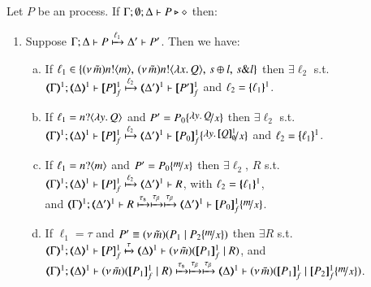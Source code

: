 
\begin{proposition}\rm
	\label{app:prop:op_corr_HOp_to_HO}
	Let $P$ be an \HOp process.
	If $\Gamma; \emptyset; \Delta \vdash P \triangleright \diamond$ then:
%
	\begin{enumerate}[1.]
		\item
			Suppose $\Gamma; \Delta \vdash P \xmapsto{\ell_1} \Delta' \vdash P'$. Then we have:
%
			\begin{enumerate}[a)]
				\item
					If $\ell_1 \in \{(\nu\, \tilde{m})n ! \langle m \rangle, \,(\nu\, \tilde{m})n ! \langle \lambda x.\,Q \rangle, \,s \oplus l, \,s \& l\}$
					then $\exists \ell_2$ s.t. \\
					$\horel{\tmap{\Gamma}{1}}{\tmap{\Delta}{1}}{\pmapp{P}{1}{f}}{\hby{\ell_2}}{\tmap{\Delta'}{1}}{\pmapp{P'}{1}{f}}$
					and $\ell_2 = \{\!\!\{\ell_1\}\!\!\}^{1}$.
			
				\item
					If $\ell_1 = n ? \langle \lambda y.\,Q \rangle$ and
					$P' = P_0 \subst{\abs{y}Q}{x}$
					then $\exists \ell_2$ s.t. \\
					$\horel{\tmap{\Gamma}{1}}{\tmap{\Delta}{1}}{\pmapp{P}{1}{f}}{\hby{\ell_2}}{\tmap{\Delta'}{1}}{\pmapp{P_0}{1}{f}\subst{\abs{y}\pmapp{Q}{1}{\emptyset}}{x}}$
					and $\ell_2 = \{\!\!\{\ell_1\}\!\!\}^{1}$.
			
				\item
					If $\ell_1 = n ? \langle m \rangle$
					and 
					$P' = P_0 \subst{m}{x}$
					then $\exists \ell_2$, $R$ s.t. \\
					$\horel{\tmap{\Gamma}{1}}{\tmap{\Delta}{1}}{\pmapp{P}{1}{f}}{\hby{\ell_2}}{\tmap{\Delta'}{1}}{R}$,
					with $\ell_2 = \{\!\!\{\ell_1\}\!\!\}^{1}$, \\
					and
					$\horel{\tmap{\Gamma}{1}}{\tmap{\Delta'}{1}}{R}{\hby{\stau} \hby{\btau} \hby{\btau}}
					{\tmap{\Delta'}{1}}{\pmapp{P_0}{1}{f}\subst{m}{x}}$.
						
				\item
					If $\ell_1 = \tau$
					and $P' \scong \newsp{\tilde{m}}{P_1 \Par P_2\subst{m}{x}}$
					then $\exists R$ s.t. \\
					$\horel{\tmap{\Gamma}{1}}{\tmap{\Delta}{1}}{\pmapp{P}{1}{f}}{\hby{\tau}}{\mapt{\Delta}^{1}}{\newsp{\tilde{m}}{\pmapp{P_1}{1}{f} \Par R}}$,
					and\\ 
					$\horel{\tmap{\Gamma}{1}}{\tmap{\Delta}{1}}{\newsp{\tilde{m}}{\pmapp{P_1}{1}{f} \Par R}}{\hby{\stau} \hby{\btau} \hby{\btau}}
					{\mapt{\Delta}^{1}}{\newsp{\tilde{m}}{\pmapp{P_1}{1}{f} \Par \pmapp{P_2}{1}{f}\subst{m}{x}}}$.
			

\end{enumerate}
\end{enumerate}
\end{proposition}
